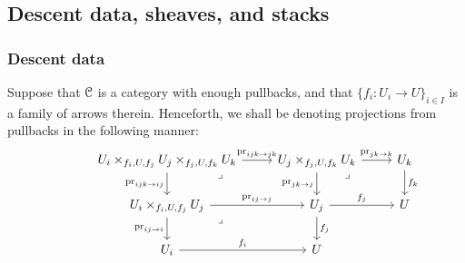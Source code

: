     \subsection{Descent data, sheaves, and stacks}
        \subsubsection{Descent data}
            \begin{convention}
                Suppose that $\mathcal{C}$ is a category with enough pullbacks, and that $\{f_i: U_i \to U\}_{i \in I}$ is a family of arrows therein. Henceforth, we shall be denoting projections from pullbacks in the following manner:
                    $$
                        \begin{tikzcd}
                        	& {U_i \x_{f_i, U, f_j} U_j \x_{f_j, U, f_k} U_k} & {U_j \x_{f_j, U, f_k} U_k} & {U_k} \\
                        	{} & {U_i \x_{f_i, U, f_j} U_j} & {U_j} & U \\
                        	& {U_i} & U
                        	\arrow["{f_i}", from=3-2, to=3-3]
                        	\arrow["{f_j}", from=2-3, to=3-3]
                        	\arrow["{f_j}", from=2-3, to=2-4]
                        	\arrow["{f_k}", from=1-4, to=2-4]
                        	\arrow["{\pr_{ij \to i}}"', from=2-2, to=3-2]
                        	\arrow["{\pr_{ij \to j}}", from=2-2, to=2-3]
                        	\arrow["{\pr_{jk \to j}}"', from=1-3, to=2-3]
                        	\arrow["{\pr_{jk \to k}}", from=1-3, to=1-4]
                        	\arrow["\lrcorner"{anchor=center, pos=0.125}, draw=none, from=1-3, to=2-4]
                        	\arrow["\lrcorner"{anchor=center, pos=0.125}, draw=none, from=2-2, to=3-3]
                        	\arrow["{\pr_{ijk \to ij}}"', from=1-2, to=2-2]
                        	\arrow["{\pr_{ijk \to jk}}", from=1-2, to=1-3]
                        	\arrow["\lrcorner"{anchor=center, pos=0.125}, draw=none, from=1-2, to=2-3]
                        \end{tikzcd}
                    $$
            \end{convention}
